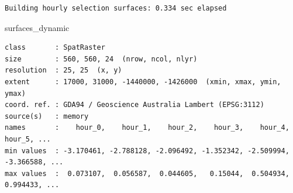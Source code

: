 \documentclass[
  letterpaper,
  DIV=11,
  numbers=noendperiod]{scrartcl}
\newenvironment{Shaded}{\begin{snugshade}}{\end{snugshade}}
\newcommand{\CommentTok}[1]{\textcolor[rgb]{0.37,0.37,0.37}{#1}}
\newcommand{\ControlFlowTok}[1]{\textcolor[rgb]{0.00,0.23,0.31}{\textbf{#1}}}
\newcommand{\DecValTok}[1]{\textcolor[rgb]{0.68,0.00,0.00}{#1}}
\newcommand{\FunctionTok}[1]{\textcolor[rgb]{0.28,0.35,0.67}{#1}}
\newcommand{\NormalTok}[1]{\textcolor[rgb]{0.00,0.23,0.31}{#1}}
\newcommand{\OtherTok}[1]{\textcolor[rgb]{0.00,0.23,0.31}{#1}}
\newcommand{\SpecialCharTok}[1]{\textcolor[rgb]{0.37,0.37,0.37}{#1}}
\newcommand{\StringTok}[1]{\textcolor[rgb]{0.13,0.47,0.30}{#1}}
\begin{document}
\begin{Shaded}
\end{Shaded}

\begin{verbatim}
Building hourly selection surfaces: 0.334 sec elapsed
\end{verbatim}

\begin{Shaded}
\begin{Highlighting}[]
\NormalTok{surfaces\_dynamic}
\end{Highlighting}
\end{Shaded}

\begin{verbatim}
class       : SpatRaster
size        : 560, 560, 24  (nrow, ncol, nlyr)
resolution  : 25, 25  (x, y)
extent      : 17000, 31000, -1440000, -1426000  (xmin, xmax, ymin, ymax)
coord. ref. : GDA94 / Geoscience Australia Lambert (EPSG:3112)
source(s)   : memory
names       :    hour_0,    hour_1,    hour_2,    hour_3,    hour_4,    hour_5, ...
min values  : -3.170461, -2.788128, -2.096492, -1.352342, -2.509994, -3.366588, ...
max values  :  0.073107,  0.056587,  0.044605,   0.15044,  0.504934,  0.994433, ...
\end{verbatim}
\end{document}
